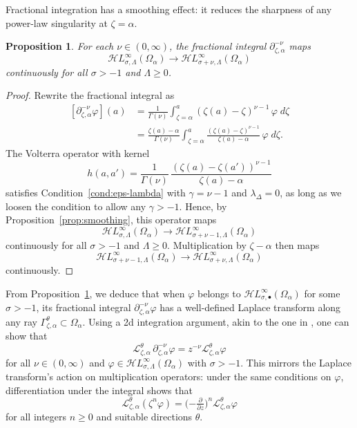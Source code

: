 \documentclass{article}
\theoremstyle{definition}
\theoremstyle{plain}
\newtheorem{proposition}{Proposition}
\newcommand{\laplace}{\mathcal{L}}
\newcommand{\fracderiv}[3]{\partial^{#1}_{#2, #3}}
\newcommand{\singexp}[2]{\mathcal{H}L^\infty_{#1, #2}}
\newcommand{\singexpalg}[1]{\singexp{#1}{\bullet}}
\newcommand{\domain}{\Omega}
\begin{document}
Fractional integration has a smoothing effect: it reduces the sharpness of any power-law singularity at $\zeta = \alpha$.
\begin{proposition}\label{prop:frac-int-smoothing}
For each $\nu \in (0, \infty)$, the fractional integral $\fracderiv{-\nu}{\zeta}{\alpha}$ maps
\[ \singexp{\sigma}{\Lambda}(\domain_\alpha) \to \singexp{\sigma+\nu}{\Lambda}(\domain_\alpha) \]
continuously for all $\sigma > -1$ and $\Lambda \ge 0$.
\end{proposition}
\begin{proof}
Rewrite the fractional integral as
\begin{align*}
\left[\fracderiv{-\nu}{\zeta}{\alpha} \varphi\right](a)&=\frac{1}{\Gamma(\nu)}\int_{\zeta=\alpha}^a (\zeta(a)-\zeta)^{\nu-1} \, \varphi \; d\zeta\\
&=\frac{\zeta(a)-\alpha}{\Gamma(\nu)}\int_{\zeta=\alpha}^a \frac{(\zeta(a)-\zeta)^{\nu-1}}{\zeta(a)- \alpha}\,\varphi \; d\zeta.
\end{align*}
The Volterra operator with kernel
\[ h(a, a') = \frac{1}{\Gamma(\nu)}\,\frac{(\zeta(a)-\zeta(a'))^{\nu-1}}{\zeta(a)- \alpha} \]
satisfies Condition~\eqref{cond:eps-lambda} with $\gamma=\nu-1$ and $\lambda_\Delta=0$, as long as we loosen the condition to allow any $\gamma > -1$. Hence, by Proposition~\ref{prop:smoothing}, this operator maps
\[ \singexp{\sigma}{\Lambda}(\domain_\alpha) \to \singexp{\sigma+\nu-1}{\Lambda}(\domain_\alpha) \]
continuously for all $\sigma > -1$ and $\Lambda \ge 0$. Multiplication by $\zeta - \alpha$ then maps
\[ \singexp{\sigma+\nu-1}{\Lambda}(\domain_\alpha) \to \singexp{\sigma+\nu}{\Lambda}(\domain_\alpha) \]
continuously.
\end{proof}

From Proposition~\ref{prop:frac-int-smoothing}, we deduce that when $\varphi$ belongs to $\singexpalg{\sigma}(\domain_\alpha)$ for some $\sigma > -1$, its fractional integral $\fracderiv{-\nu}{\zeta}{\alpha}\varphi$ has a well-defined Laplace transform along any ray $\Gamma_{\zeta,\alpha}^{\theta}\subset\domain_\alpha$. Using a 2d integration argument, akin to the one in \cite[Theorem~2.39]{laplace-tfm}, one can show that 
\[ \laplace_{\zeta,\alpha}^{\theta}\,\fracderiv{-\nu}{\zeta}{\alpha} \varphi = z^{-\nu} \laplace_{\zeta, \alpha}^{\theta} \varphi \]
for all $\nu \in (0, \infty)$ and $\varphi\in\singexp{\sigma}{\Lambda}(\domain_\alpha)$ with $\sigma>-1$. This mirrors the Laplace transform's action on multiplication operators: under the same conditions on $\varphi$, differentiation under the integral shows that~\cite[Theorem~1.34]{laplace-tfm}
\[ \laplace_{\zeta,\alpha}^\theta (\zeta^n \varphi) = \big({-\tfrac{\partial}{\partial z}}\big)^n \laplace_{\zeta,\alpha}^\theta \varphi \]
for all integers $n \ge 0$ and suitable directions $\theta$.
\end{document}
